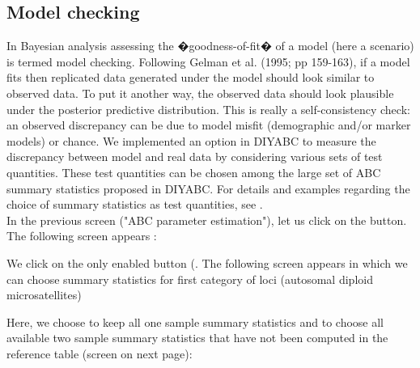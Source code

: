 {%


\newpage
\subsection{Model checking}
In Bayesian analysis assessing the �goodness-of-fit� of a model (here a scenario) is termed model checking. Following Gelman et al. (1995; pp 159-163), if a model fits then replicated data generated under the model should look similar to observed data. To put it another way, the observed data should look plausible under the posterior predictive distribution. This is really a self-consistency check: an observed discrepancy can be due to model misfit (demographic and/or marker models) or chance. We implemented an option in DIYABC to measure the discrepancy between model and real data by considering various sets of test quantities. These test quantities can be chosen among the large set of ABC summary statistics proposed in DIYABC. For details and examples regarding the choice of summary statistics as test quantities, see \citet{C2010}.\\
In the previous screen ("ABC parameter estimation"), let us click on the  button. The following screen appears :


We click on the only enabled button (. The following screen appears in which we can choose summary statistics for first category of loci (autosomal diploid microsatellites)


Here, we choose to keep all one sample summary statistics and to choose all available two sample summary statistics that have not been computed in the reference table (screen on next page):

}
